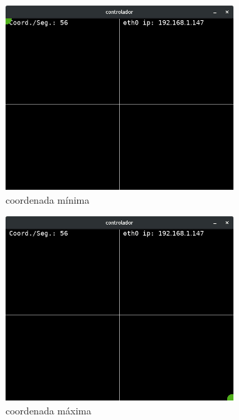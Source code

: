 \begin{figure}[H]
	\centering
	\begin{subfigure}{.5\textwidth}
		\includegraphics[width=0.95\textwidth]{figuras/controlador0x0.jpg}
		\caption{coordenada mínima}
		\label{fig:sistcoord0x0}
	\end{subfigure}%
	\begin{subfigure}{.5\textwidth}
		\includegraphics[width=0.95\textwidth]{figuras/controlador100x100.jpg}
		\caption{coordenada máxima}
		\label{fig:sistcoord100x100}
	\end{subfigure}
	\begin{subfigure}{.5\textwidth}

\end{subfigure}
\end{figure}
